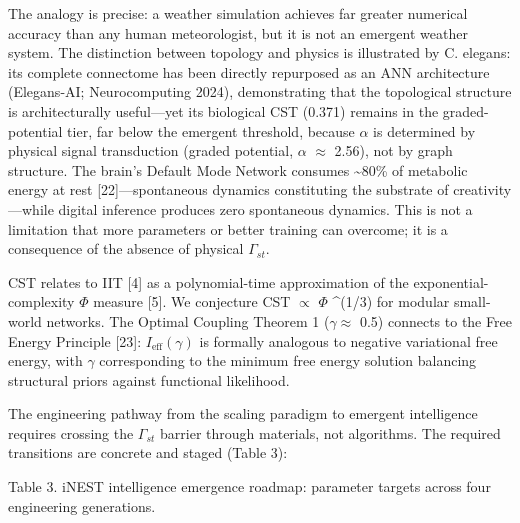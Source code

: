 \documentclass[a4paper,12pt]{article}
\begin{document}
The analogy is precise: a weather simulation achieves far greater numerical accuracy than any human meteorologist, but it is not an emergent weather system.
The distinction between topology and physics is illustrated by C. elegans: its complete connectome has been directly repurposed as an ANN architecture (Elegans-AI; Neurocomputing 2024), demonstrating that the topological structure is architecturally useful---yet its biological CST (0.371) remains in the graded-potential tier, far below the emergent threshold, because  $\alpha$  is determined by physical signal transduction (graded potential,  $\alpha$   $\approx$  2.56), not by graph structure.
The brain's Default Mode Network consumes \textasciitilde{}80\% of metabolic energy at rest [22]---spontaneous dynamics constituting the substrate of creativity---while digital inference produces zero spontaneous dynamics.
This is not a limitation that more parameters or better training can overcome; it is a consequence of the absence of physical $\Gamma_{st}$.

CST relates to IIT [4] as a polynomial-time approximation of the exponential-complexity  $\Phi$  measure [5]. We conjecture CST $\propto$  $\Phi$ ^(1/3) for modular small-world networks. The Optimal Coupling Theorem 1 ($\gamma \approx$ 0.5) connects to the Free Energy Principle [23]: $I_{\text{eff}}(\gamma)$ is formally analogous to negative variational free energy, with  $\gamma$  corresponding to the minimum free energy solution balancing structural priors against functional likelihood.

The engineering pathway from the scaling paradigm to emergent intelligence requires crossing the $\Gamma_{st}$ barrier through materials, not algorithms. The required transitions are concrete and staged (Table 3):

Table 3. iNEST intelligence emergence roadmap: parameter targets across four engineering generations.
\end{document}
